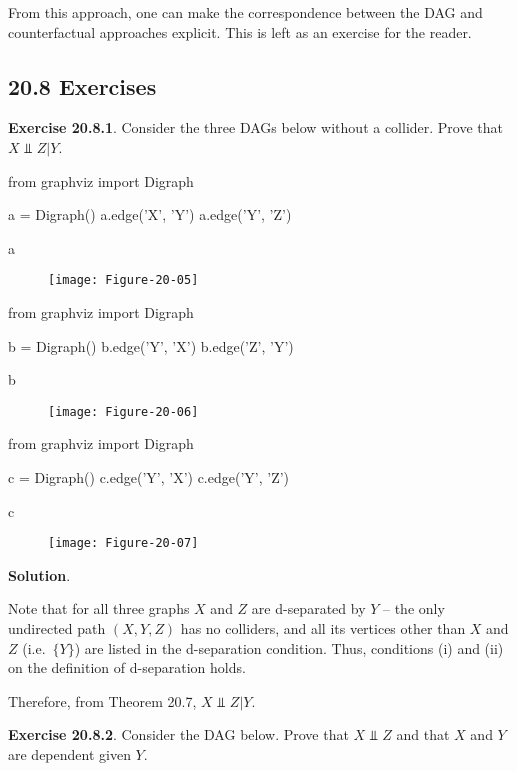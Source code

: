 From this approach, one can make the correspondence between the DAG and
counterfactual approaches explicit. This is left as an exercise for the
reader.

\subsection*{20.8 Exercises}

\textbf{Exercise 20.8.1}. Consider the three DAGs below without a
collider. Prove that \(X \text{ ⫫ } Z | Y\).

\begin{python}
from graphviz import Digraph

a = Digraph()
a.edge('X', 'Y')
a.edge('Y', 'Z')

a
\end{python}
 
\begin{figure}[H]
\centering
\texttt{[image: Figure-20-05]}
\end{figure}

\begin{python}
from graphviz import Digraph

b = Digraph()
b.edge('Y', 'X')
b.edge('Z', 'Y')

b
\end{python}
 
\begin{figure}[H]
\centering
\texttt{[image: Figure-20-06]}
\end{figure}

\begin{python}
from graphviz import Digraph

c = Digraph()
c.edge('Y', 'X')
c.edge('Y', 'Z')

c
\end{python}

\begin{figure}[H]
\centering
\texttt{[image: Figure-20-07]}
\end{figure}

\textbf{Solution}.

Note that for all three graphs \(X\) and \(Z\) are d-separated by \(Y\)
-- the only undirected path \((X, Y, Z)\) has no colliders, and all its
vertices other than \(X\) and \(Z\) (i.e.~\(\{ Y \}\)) are listed in the
d-separation condition. Thus, conditions (i) and (ii) on the definition
of d-separation holds.

Therefore, from Theorem 20.7, \(X \text{ ⫫ } Z | Y\).

\textbf{Exercise 20.8.2}. Consider the DAG below. Prove that
\(X \text{ ⫫ } Z\) and that \(X\) and \(Y\) are dependent given \(Y\).


